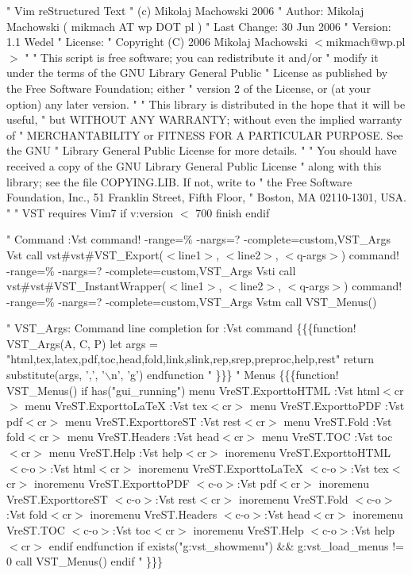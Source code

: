 \documentclass{article}
\begin{document}
" Vim reStructured Text
" (c) Mikolaj Machowski 2006
" Author: Mikolaj Machowski ( mikmach AT wp DOT pl )
" Last Change: 30 Jun 2006
" Version: 1.1 Wedel
" License:
" Copyright (C) 2006 Mikolaj Machowski $<$mikmach@wp.pl$>$
"
" This script is free software; you can redistribute it and/or
" modify it under the terms of the GNU Library General Public
" License as published by the Free Software Foundation; either
" version 2 of the License, or (at your option) any later version.
"
" This library is distributed in the hope that it will be useful,
" but WITHOUT ANY WARRANTY; without even the implied warranty of
" MERCHANTABILITY or FITNESS FOR A PARTICULAR PURPOSE. See the GNU
" Library General Public License for more details.
"
" You should have received a copy of the GNU Library General Public License
" along with this library; see the file COPYING.LIB. If not, write to
" the Free Software Foundation, Inc., 51 Franklin Street, Fifth Floor,
" Boston, MA 02110-1301, USA.
" 
" VST requires Vim7
if v:version $<$ 700
 finish
endif

" Command :Vst
command! -range=\% -nargs=? -complete=custom,VST\_Args Vst call vst\#vst\#VST\_Export($<$line1$>$, $<$line2$>$, $<$q-args$>$)
command! -range=\% -nargs=? -complete=custom,VST\_Args Vsti call vst\#vst\#VST\_InstantWrapper($<$line1$>$, $<$line2$>$, $<$q-args$>$)
command! -range=\% -nargs=? -complete=custom,VST\_Args Vstm call VST\_Menus()

" VST\_Args: Command line completion for :Vst command \{\{\{function! VST\_Args(A, C, P)
 let args = "html,tex,latex,pdf,toc,head,fold,link,slink,rep,srep,preproc,help,rest"
 return substitute(args, ',', '$\backslash$n', 'g')
endfunction
" \}\}\}
" Menus \{\{\{function! VST\_Menus()
 if has("gui\_running")
 menu VreST.ExporttoHTML :Vst html$<$cr$>$
 menu VreST.Exportto\LaTeX{} :Vst tex$<$cr$>$
 menu VreST.ExporttoPDF :Vst pdf$<$cr$>$
 menu VreST.ExporttoreST :Vst rest$<$cr$>$
 menu VreST.Fold :Vst fold$<$cr$>$
 menu VreST.Headers :Vst head$<$cr$>$
 menu VreST.TOC :Vst toc$<$cr$>$
 menu VreST.Help :Vst help$<$cr$>$
 inoremenu VreST.ExporttoHTML $<$c-o$>$:Vst html$<$cr$>$
 inoremenu VreST.Exportto\LaTeX{} $<$c-o$>$:Vst tex$<$cr$>$
 inoremenu VreST.ExporttoPDF $<$c-o$>$:Vst pdf$<$cr$>$
 inoremenu VreST.ExporttoreST $<$c-o$>$:Vst rest$<$cr$>$
 inoremenu VreST.Fold $<$c-o$>$:Vst fold$<$cr$>$
 inoremenu VreST.Headers $<$c-o$>$:Vst head$<$cr$>$
 inoremenu VreST.TOC $<$c-o$>$:Vst toc$<$cr$>$
 inoremenu VreST.Help $<$c-o$>$:Vst help$<$cr$>$
 endif
endfunction
if exists("g:vst\_showmenu") \&\& g:vst\_load\_menus != 0
 call VST\_Menus()
endif
" \}\}\}
\end{document}

